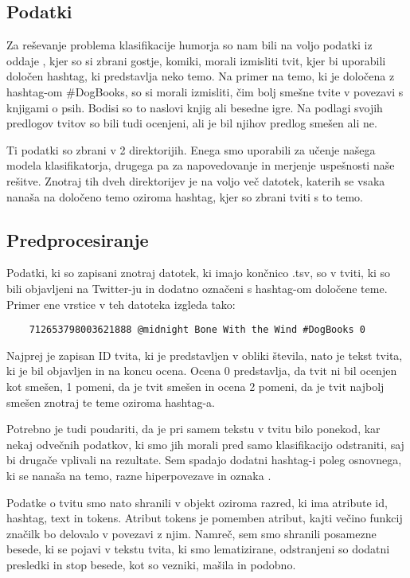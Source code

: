 \documentclass[a4paper]{article}
\begin{document}
\subsection{Podatki}

Za reševanje problema klasifikacije humorja so nam bili na voljo podatki iz oddaje \@midnight, kjer so si zbrani gostje, komiki, morali izmisliti tvit, kjer bi uporabili določen hashtag, ki predstavlja neko temo. Na primer na temo, ki je določena z hashtag-om \#DogBooks, so si morali izmisliti, čim bolj smešne tvite v povezavi s knjigami o psih. Bodisi so to naslovi knjig ali besedne igre. Na podlagi svojih predlogov tvitov so bili tudi ocenjeni, ali je bil njihov predlog smešen ali ne.

Ti podatki so zbrani v 2 direktorijih. Enega smo uporabili za učenje našega modela klasifikatorja, drugega pa za napovedovanje in merjenje uspešnosti naše rešitve. Znotraj tih dveh direktorijev je na voljo več datotek, katerih se vsaka nanaša na določeno temo oziroma hashtag, kjer so zbrani tviti s to temo.

\subsection{Predprocesiranje}

Podatki, ki so zapisani znotraj datotek, ki imajo končnico .tsv, so v tviti, ki so bili objavljeni na Twitter-ju in dodatno označeni s hashtag-om določene teme. Primer ene vrstice v teh datoteka izgleda tako:

\begin{lstlisting}
	712653798003621888 @midnight Bone With the Wind #DogBooks 0
\end{lstlisting}

Najprej je zapisan ID tvita, ki je predstavljen v obliki števila, nato je tekst tvita, ki je bil objavljen in na koncu ocena. Ocena 0 predstavlja, da tvit ni bil ocenjen kot smešen, 1 pomeni, da je tvit smešen in ocena 2 pomeni, da je tvit najbolj smešen znotraj te teme oziroma hashtag-a.

Potrebno je tudi poudariti, da je pri samem tekstu v tvitu bilo ponekod, kar nekaj odvečnih podatkov, ki smo jih morali pred samo klasifikacijo odstraniti, saj bi drugače vplivali na rezultate. Sem spadajo dodatni hashtag-i poleg osnovnega, ki se nanaša na temo, razne hiperpovezave in oznaka \@midnight. 

Podatke o tvitu smo nato shranili v objekt oziroma razred, ki ima atribute id, hashtag, text in tokens. Atribut tokens je pomemben atribut, kajti večino funkcij značilk bo delovalo v povezavi z njim. Namreč, sem smo shranili posamezne besede, ki se pojavi v tekstu tvita, ki smo lematizirane, odstranjeni so dodatni presledki in stop besede, kot so vezniki, mašila in podobno.
\end{document}
